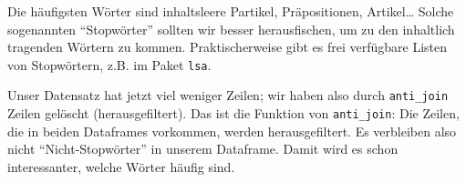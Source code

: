 \documentclass[12pt,]{book}
\makeatletter
\newenvironment{Shaded}{\begin{snugshade}}{\end{snugshade}}
\newcommand{\KeywordTok}[1]{\textcolor[rgb]{0.13,0.29,0.53}{\textbf{{#1}}}}
\newcommand{\DataTypeTok}[1]{\textcolor[rgb]{0.13,0.29,0.53}{{#1}}}
\newcommand{\DecValTok}[1]{\textcolor[rgb]{0.00,0.00,0.81}{{#1}}}
\newcommand{\StringTok}[1]{\textcolor[rgb]{0.31,0.60,0.02}{{#1}}}
\newcommand{\CommentTok}[1]{\textcolor[rgb]{0.56,0.35,0.01}{\textit{{#1}}}}
\newcommand{\OtherTok}[1]{\textcolor[rgb]{0.56,0.35,0.01}{{#1}}}
\newcommand{\NormalTok}[1]{{#1}}
\newenvironment{kframe}{%
\medskip{}
\setlength{\fboxsep}{.8em}
 \def\at@end@of@kframe{}%
 \ifinner\ifhmode%
  \def\at@end@of@kframe{\end{minipage}}%
  \begin{minipage}{\columnwidth}%
 \fi\fi%
 \def\FrameCommand##1{\hskip\@totalleftmargin \hskip-\fboxsep
 \colorbox{shadecolor}{##1}\hskip-\fboxsep
     \hskip-\linewidth \hskip-\@totalleftmargin \hskip\columnwidth}%
 \MakeFramed {\advance\hsize-\width
   \@totalleftmargin\z@ \linewidth\hsize
   \@setminipage}}%
 {\par\unskip\endMakeFramed%
 \at@end@of@kframe}
\renewenvironment{Shaded}{\begin{kframe}}{\end{kframe}}
\makeatother
\begin{document}
\begin{Shaded}
\end{Shaded}

Die häufigsten Wörter sind inhaltsleere Partikel, Präpositionen,
Artikel\ldots{} Solche sogenannten ``Stopwörter'' sollten wir besser
herausfischen, um zu den inhaltlich tragenden Wörtern zu kommen.
Praktischerweise gibt es frei verfügbare Listen von Stopwörtern, z.B. im
Paket \texttt{lsa}.

\begin{Shaded}
\end{Shaded}

Unser Datensatz hat jetzt viel weniger Zeilen; wir haben also durch
\texttt{anti\_join} Zeilen gelöscht (herausgefiltert). Das ist die
Funktion von \texttt{anti\_join}: Die Zeilen, die in beiden Dataframes
vorkommen, werden herausgefiltert. Es verbleiben also nicht
``Nicht-Stopwörter'' in unserem Dataframe. Damit wird es schon
interessanter, welche Wörter häufig sind.

\begin{Shaded}
\end{Shaded}
\end{document}
